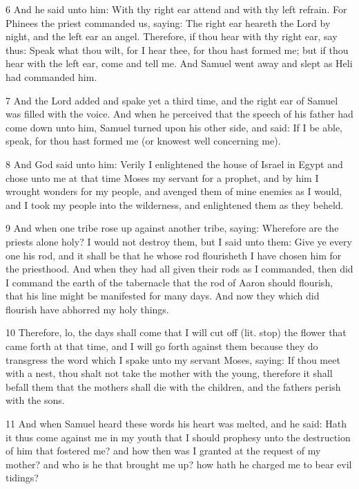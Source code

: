 \par 6 And he said unto him: With thy right ear attend and with thy left refrain. For Phinees the priest commanded us, saying: The right ear heareth the Lord by night, and the left ear an angel. Therefore, if thou hear with thy right ear, say thus: Speak what thou wilt, for I hear thee, for thou hast formed me; but if thou hear with the left ear, come and tell me. And Samuel went away and slept as Heli had commanded him.

\par 7 And the Lord added and spake yet a third time, and the right ear of Samuel was filled with the voice. And when he perceived that the speech of his father had come down unto him, Samuel turned upon his other side, and said: If I be able, speak, for thou hast formed me (or knowest well concerning me).

\par 8 And God said unto him: Verily I enlightened the house of Israel in Egypt and chose unto me at that time Moses my servant for a prophet, and by him I wrought wonders for my people, and avenged them of mine enemies as I would, and I took my people into the wilderness, and enlightened them as they beheld. 

\par 9 And when one tribe rose up against another tribe, saying: Wherefore are the priests alone holy? I would not destroy them, but I said unto them: Give ye every one his rod, and it shall be that he whose rod flourisheth I have chosen him for the priesthood. And when they had all given their rods as I commanded, then did I command the earth of the tabernacle that the rod of Aaron should flourish, that his line might be manifested for many days. And now they which did flourish have abhorred my holy things. 

\par 10 Therefore, lo, the days shall come that I will cut off (lit. stop) the flower that came forth at that time, and I will go forth against them because they do transgress the word which I spake unto my servant Moses, saying: If thou meet with a nest, thou shalt not take the mother with the young, therefore it shall befall them that the mothers shall die with the children, and the fathers perish with the sons.

\par 11 And when Samuel heard these words his heart was melted, and he said: Hath it thus come against me in my youth that I should prophesy unto the destruction of him that fostered me? and how then was I granted at the request of my mother? and who is he that brought me up? how hath he charged me to bear evil tidings? 

